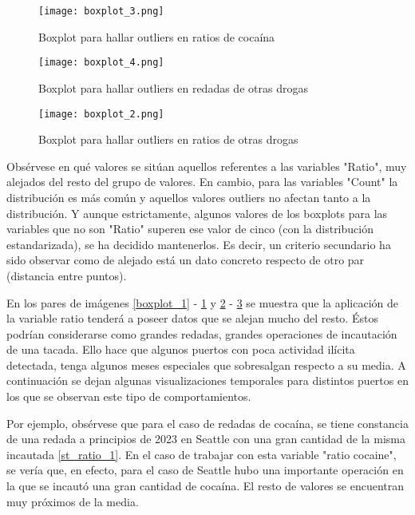 \documentclass[12pt]{article}
\begin{document}
		\begin{figure}[H]
			\caption{\label{boxplot_3} Boxplot para hallar outliers en ratios de cocaína}
			\centering
			\hspace*{1cm}
			\texttt{[image: boxplot\_3.png]}
		\end{figure}
	
		\begin{figure}[H]
			\caption{\label{boxplot_4} Boxplot para hallar outliers en redadas de otras drogas}
			\centering
			\hspace*{1cm}
			\texttt{[image: boxplot\_4.png]}
		\end{figure}
	
		\begin{figure}[H]
			\caption{\label{boxplot_2} Boxplot para hallar outliers en ratios de otras drogas}
			\centering
			\hspace*{1cm}
			\texttt{[image: boxplot\_2.png]}
		\end{figure}
	
		Obsérvese en qué valores se sitúan aquellos referentes a las variables "Ratio", muy alejados del resto del grupo de valores. En cambio, para las variables "Count" la distribución es más común y aquellos valores outliers no afectan tanto a la distribución. Y aunque estrictamente, algunos valores de los boxplots para las variables que no son "Ratio" superen ese valor de cinco (con la distribución estandarizada), se ha decidido mantenerlos. Es decir, un criterio secundario ha sido observar como de alejado está un dato concreto respecto de otro par (distancia entre puntos).
	
		En los pares de imágenes \ref{boxplot_1} - \ref{boxplot_3}  y \ref{boxplot_4} - \ref{boxplot_2} se muestra que la aplicación de la variable ratio tenderá a poseer datos que se alejan mucho del resto. Éstos podrían considerarse como grandes redadas, grandes operaciones de incautación de una tacada. Ello hace que algunos puertos con poca actividad ilícita detectada, tenga algunos meses especiales que sobresalgan respecto a su media. A continuación se dejan algunas visualizaciones temporales para distintos puertos en los que se observan este tipo de comportamientos.
	
		Por ejemplo, obsérvese que para el caso de redadas de cocaína, se tiene constancia de una redada a principios de 2023 en Seattle con una gran cantidad de la misma incautada \ref{st_ratio_1}. En el caso de trabajar con esta variable "ratio cocaine", se vería que, en efecto, para el caso de Seattle hubo una importante operación en la que se incautó una gran cantidad de cocaína. El resto de valores se encuentran muy próximos de la media.
		
\end{document}
